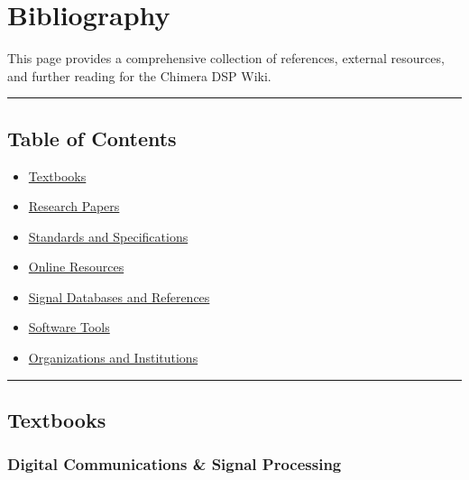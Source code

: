 \section{Bibliography}\label{bibliography}

This page provides a comprehensive collection of references, external
resources, and further reading for the Chimera DSP Wiki.

\begin{center}\rule{0.5\linewidth}{0.5pt}\end{center}

\subsection{\texorpdfstring{ Table of
Contents}{ Table of Contents}}\label{table-of-contents}

\begin{itemize}
\tightlist
\item
  \hyperref[textbooks]{Textbooks}
\item
  \hyperref[research-papers]{Research Papers}
\item
  \hyperref[standards-and-specifications]{Standards and Specifications}
\item
  \hyperref[online-resources]{Online Resources}
\item
  \hyperref[signal-databases-and-references]{Signal Databases and
  References}
\item
  \hyperref[software-tools]{Software Tools}
\item
  \hyperref[organizations-and-institutions]{Organizations and
  Institutions}
\end{itemize}

\begin{center}\rule{0.5\linewidth}{0.5pt}\end{center}

\subsection{\texorpdfstring{ Textbooks}{ Textbooks}}\label{textbooks}

\subsubsection{Digital Communications \& Signal
Processing}\label{digital-communications-signal-processing}

